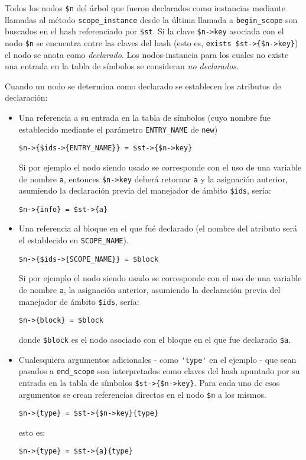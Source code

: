 Todos los nodos \verb|$n| del árbol que fueron
declarados como instancias mediante llamadas al método
\verb|scope_instance|
desde la última llamada a  \verb|begin_scope|
son buscados en el hash referenciado por \verb|$st|.
Si la clave \verb|$n->key| asociada con el nodo \verb|$n|
se encuentra entre las claves del hash (esto es,
\verb|exists $st->{$n->key}|) el nodo se
anota como \emph{declarado}. Los nodos-instancia para los cuales
no existe una entrada en la tabla de símbolos se consideran
\emph{no declarados}.

Cuando un nodo se determina como declarado 
se establecen los atributos de 
declaración: 
\begin{itemize}
\item
Una referencia a su entrada en la tabla de símbolos
(cuyo nombre fue establecido mediante el parámetro \verb|ENTRY_NAME|
de \verb|new|) 
\begin{verbatim}
$n->{$ids->{ENTRY_NAME}} = $st->{$n->key}
\end{verbatim}
Si por ejemplo el nodo siendo usado se corresponde con el uso de una variable de nombre \verb|a|,
entonces \verb|$n->key| deberá retornar \verb|a| y la asignación anterior, asumiendo la declaración
previa del manejador de ámbito \verb|$ids|, sería:
\begin{verbatim}
$n->{info} = $st->{a}
\end{verbatim}

\item
Una referencia al bloque
en el que fué declarado (el nombre del atributo será el establecido
en \verb|SCOPE_NAME|). 
\begin{verbatim}
$n->{$ids->{SCOPE_NAME}} = $block
\end{verbatim}
Si por ejemplo el nodo siendo usado se corresponde con el uso de una variable de nombre \verb|a|,
la asignación anterior, asumiendo la declaración
previa del manejador de ámbito \verb|$ids|, sería:
\begin{verbatim}
$n->{block} = $block
\end{verbatim}
donde \verb|$block| es el nodo asociado con el bloque en el que fue declarado
\verb|$a|.
\item
Cualesquiera argumentos
adicionales - como \verb|'type'| en el ejemplo - 
que sean pasados a \verb|end_scope| son interpretados
como claves del hash apuntado por su entrada en la tabla de 
símbolos \verb|$st->{$n->key}|. Para cada uno de esos argumentos
se crean referencias directas en el nodo \verb|$n| a los mismos.
\begin{verbatim}
$n->{type} = $st->{$n->key}{type}
\end{verbatim}
esto es:
\begin{verbatim}
$n->{type} = $st->{a}{type}
\end{verbatim}
\end{itemize}


